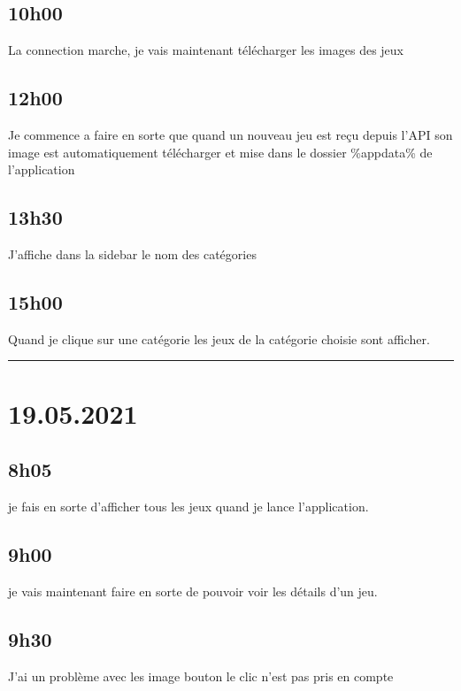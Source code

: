 \documentclass[a4paper,12pt,french]{sphinxmanual}
\begin{document}
\subsection{10h00}
\label{\detokenize{logbook:id125}}
\sphinxAtStartPar
La connection marche, je vais maintenant télécharger les images des jeux


\subsection{12h00}
\label{\detokenize{logbook:id126}}
\sphinxAtStartPar
Je commence a faire en sorte que quand un nouveau jeu est reçu depuis l’API son image est automatiquement télécharger et mise dans le dossier \%appdata\% de l’application


\subsection{13h30}
\label{\detokenize{logbook:id127}}
\sphinxAtStartPar
J’affiche dans la sidebar le nom des catégories


\subsection{15h00}
\label{\detokenize{logbook:id128}}
\sphinxAtStartPar
Quand je clique sur une catégorie les jeux de la catégorie choisie sont afficher.


\bigskip\hrule\bigskip



\section{19.05.2021}
\label{\detokenize{logbook:id129}}

\subsection{8h05}
\label{\detokenize{logbook:id130}}
\sphinxAtStartPar
je fais en sorte d’afficher tous les jeux quand je lance l’application.


\subsection{9h00}
\label{\detokenize{logbook:id131}}
\sphinxAtStartPar
je vais maintenant faire en sorte de pouvoir voir les détails d’un jeu.


\subsection{9h30}
\label{\detokenize{logbook:id132}}
\sphinxAtStartPar
J’ai un problème avec les image bouton le clic n’est pas pris en compte
\end{document}
